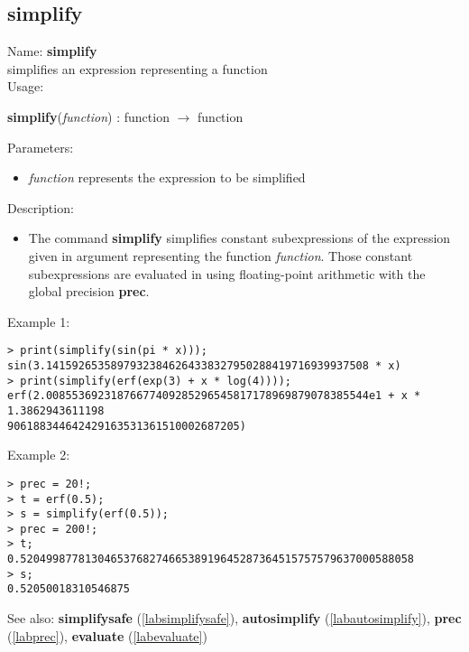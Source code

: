 \subsection{simplify}
\label{labsimplify}
\noindent Name: \textbf{simplify}\\
simplifies an expression representing a function\\

\noindent Usage: 
\begin{center}
\textbf{simplify}(\emph{function}) : \textsf{function} $\rightarrow$ \textsf{function}\\
\end{center}
Parameters: 
\begin{itemize}
\item \emph{function} represents the expression to be simplified
\end{itemize}
\noindent Description: \begin{itemize}

\item The command \textbf{simplify} simplifies constant subexpressions of the
   expression given in argument representing the function
   \emph{function}. Those constant subexpressions are evaluated in using
   floating-point arithmetic with the global precision \textbf{prec}.
\end{itemize}
\noindent Example 1: 
\begin{center}\begin{minipage}{15cm}\begin{Verbatim}[frame=single]
> print(simplify(sin(pi * x)));
sin(3.14159265358979323846264338327950288419716939937508 * x)
> print(simplify(erf(exp(3) + x * log(4))));
erf(2.00855369231876677409285296545817178969879078385544e1 + x * 1.3862943611198
906188344642429163531361510002687205)
\end{Verbatim}
\end{minipage}\end{center}
\noindent Example 2: 
\begin{center}\begin{minipage}{15cm}\begin{Verbatim}[frame=single]
> prec = 20!;
> t = erf(0.5);
> s = simplify(erf(0.5));
> prec = 200!;
> t;
0.5204998778130465376827466538919645287364515757579637000588058
> s;
0.52050018310546875
\end{Verbatim}
\end{minipage}\end{center}
See also: \textbf{simplifysafe} (\ref{labsimplifysafe}), \textbf{autosimplify} (\ref{labautosimplify}), \textbf{prec} (\ref{labprec}), \textbf{evaluate} (\ref{labevaluate})
